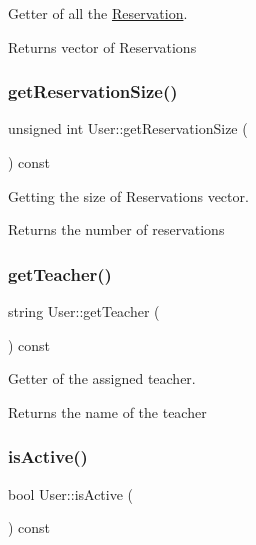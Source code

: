 Getter of all the \mbox{\hyperlink{class_reservation}{Reservation}}. 

\begin{DoxyReturn}{Returns}
vector of Reservations 
\end{DoxyReturn}
\mbox{\label{class_user_ad87b45e028489ed785fa82a4c9fc6739}} 
\subsubsection{\texorpdfstring{get\+Reservation\+Size()}{getReservationSize()}}
{\footnotesize\ttfamily unsigned int User\+::get\+Reservation\+Size (\begin{DoxyParamCaption}{ }\end{DoxyParamCaption}) const}



Getting the size of Reservations vector. 

\begin{DoxyReturn}{Returns}
the number of reservations 
\end{DoxyReturn}
\mbox{\label{class_user_aafe37a3bb0e14e669e42f2fee9e0ce29}} 
\subsubsection{\texorpdfstring{get\+Teacher()}{getTeacher()}}
{\footnotesize\ttfamily string User\+::get\+Teacher (\begin{DoxyParamCaption}{ }\end{DoxyParamCaption}) const}



Getter of the assigned teacher. 

\begin{DoxyReturn}{Returns}
the name of the teacher 
\end{DoxyReturn}
\mbox{\label{class_user_a9c6060d37c200406c1561fd211181127}} 
\subsubsection{\texorpdfstring{is\+Active()}{isActive()}}
{\footnotesize\ttfamily bool User\+::is\+Active (\begin{DoxyParamCaption}{ }\end{DoxyParamCaption}) const}



